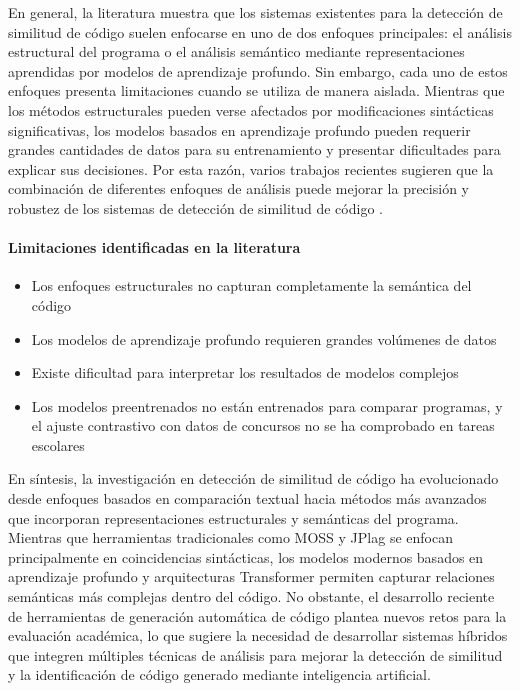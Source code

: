 En general, la literatura muestra que los sistemas existentes para la detección de similitud de código suelen enfocarse en uno de dos enfoques principales: el análisis estructural del programa o el análisis semántico mediante representaciones aprendidas por modelos de aprendizaje profundo. Sin embargo, cada uno de estos enfoques presenta limitaciones cuando se utiliza de manera aislada. Mientras que los métodos estructurales pueden verse afectados por modificaciones sintácticas significativas, los modelos basados en aprendizaje profundo pueden requerir grandes cantidades de datos para su entrenamiento y presentar dificultades para explicar sus decisiones. Por esta razón, varios trabajos recientes sugieren que la combinación de diferentes enfoques de análisis puede mejorar la precisión y robustez de los sistemas de detección de similitud de código \cite{Zakeri2023Systematic}.

\paragraph{Limitaciones identificadas en la literatura}
\begin{itemize}
    \item Los enfoques estructurales no capturan completamente la semántica del código
    \item Los modelos de aprendizaje profundo requieren grandes volúmenes de datos
    \item Existe dificultad para interpretar los resultados de modelos complejos
    \item Los modelos preentrenados no están entrenados para comparar programas, y el ajuste contrastivo con datos de concursos no se ha comprobado en tareas escolares
\end{itemize}

En síntesis, la investigación en detección de similitud de código ha evolucionado desde enfoques basados en comparación textual hacia métodos más avanzados que incorporan representaciones estructurales y semánticas del programa. Mientras que herramientas tradicionales como MOSS y JPlag se enfocan principalmente en coincidencias sintácticas, los modelos modernos basados en aprendizaje profundo y arquitecturas Transformer permiten capturar relaciones semánticas más complejas dentro del código. No obstante, el desarrollo reciente de herramientas de generación automática de código plantea nuevos retos para la evaluación académica, lo que sugiere la necesidad de desarrollar sistemas híbridos que integren múltiples técnicas de análisis para mejorar la detección de similitud y la identificación de código generado mediante inteligencia artificial.

